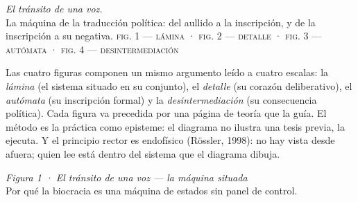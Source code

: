 \documentclass[11pt]{article}
\begin{document}
\pagestyle{empty}

{\small{}\hfill{}}
\vspace{0.1em}

{\Large\itshape El tránsito de una voz.}\\[-0.25em]
{\small\color{ink!60}La máquina de la traducción política: del aullido a la inscripción, y de la inscripción a su negativa. \textsc{\footnotesize fig. 1 — lámina} · \textsc{\footnotesize fig. 2 — detalle} · \textsc{\footnotesize fig. 3 — autómata} · \textsc{\footnotesize fig. 4 — desintermediación}}

\vspace{0.4em}

\vspace{0.6em}
\begin{center}\begin{minipage}{0.86\linewidth}\small\color{ink!85}
Las cuatro figuras componen un mismo argumento leído a cuatro escalas: la \emph{lámina} (el sistema situado en su conjunto), el \emph{detalle} (su corazón deliberativo), el \emph{autómata} (su inscripción formal) y la \emph{desintermediación} (su consecuencia política). Cada figura va precedida por una página de teoría que la guía. El método es la práctica como episteme: el diagrama no ilustra una tesis previa, la ejecuta. Y el principio rector es endofísico (Rössler, 1998): no hay vista desde afuera; quien lee está dentro del sistema que el diagrama dibuja.
\end{minipage}\end{center}

\newpage
{\Large\itshape Figura 1 · El tránsito de una voz — la máquina situada}\\[0.15em]
{\small\color{ink!60}Por qué la biocracia es una máquina de estados sin panel de control.}
\vspace{0.5em}
\end{document}
